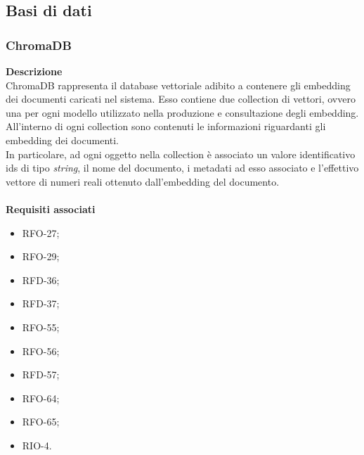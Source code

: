 \subsection{Basi di dati} \label{subsec:basididati}
\subsubsection{ChromaDB}
\textbf{Descrizione}\\
ChromaDB rappresenta il database vettoriale adibito a contenere gli embedding dei documenti caricati nel sistema. Esso contiene due collection di vettori, ovvero una per ogni modello utilizzato nella produzione e consultazione degli embedding.\\
All'interno di ogni collection sono contenuti le informazioni riguardanti gli embedding dei documenti.\\
In particolare, ad ogni oggetto nella collection è associato un valore identificativo ids di tipo \textit{string}, il nome del documento, i metadati ad esso associato e l'effettivo vettore di numeri reali ottenuto dall'embedding del documento.\\ \\
\textbf{Requisiti associati}
\begin{itemize}[itemsep=-4pt]
    \item RFO-27;
    \item RFO-29;
    \item RFD-36;
    \item RFD-37;
    \item RFO-55;
    \item RFO-56;
    \item RFD-57;
    \item RFO-64;
    \item RFO-65;
    \item RIO-4.
\end{itemize}

